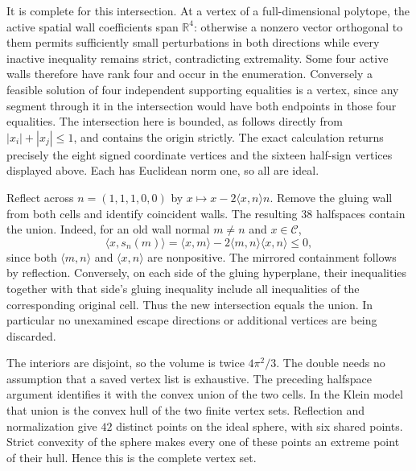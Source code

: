 \documentclass[11pt]{article}
\theoremstyle{remark}
\newcommand{\ip}[2]{\langle #1,#2\rangle}
\newcommand{\CELL}{\mathcal C}
\begin{document}
It is complete for this intersection. At a vertex of a full-dimensional
polytope, the active spatial wall coefficients span $\mathbb R^4$:
otherwise a nonzero vector orthogonal to them permits sufficiently
small perturbations in both directions while every inactive inequality
remains strict, contradicting extremality. Some four active walls
therefore have rank four and occur in the enumeration. Conversely a
feasible solution of four independent supporting equalities is a
vertex, since any segment through it in the intersection would have
both endpoints in those four equalities. The intersection here is
bounded, as follows directly from $|x_i|+|x_j|\le1$, and contains
the origin strictly. The exact calculation returns precisely the
eight signed coordinate vertices and the sixteen half-sign vertices
displayed above. Each has Euclidean norm one, so all are ideal.

Reflect across $n=(1,1,1,0,0)$ by
$x\mapsto x-2\ip{x}{n}n$. Remove the gluing wall from both cells
and identify coincident walls. The resulting 38 halfspaces contain
the union. Indeed, for an old wall normal $m\ne n$ and $x\in\CELL$,
\[
 \ip{x}{s_n(m)}=\ip{x}{m}-2\ip{m}{n}\ip{x}{n}\le0,
\]
since both $\ip{m}{n}$ and $\ip{x}{n}$ are nonpositive. The
mirrored containment follows by reflection. Conversely, on each side of the gluing hyperplane, their
inequalities together with that side's gluing inequality include all
inequalities of the corresponding original cell. Thus the new
intersection equals the union. In particular no unexamined escape
directions or additional vertices are being discarded.

The interiors are disjoint, so the volume is twice $4\pi^2/3$.
The double needs no assumption that a saved vertex list is exhaustive.
The preceding halfspace argument identifies it with the convex union
of the two cells. In the Klein model that union is the convex hull
of the two finite vertex sets. Reflection and normalization give
$42$ distinct points on the ideal sphere, with six shared points.
Strict convexity of the sphere makes every one of these points an
extreme point of their hull. Hence this is the complete vertex set.
\end{document}
